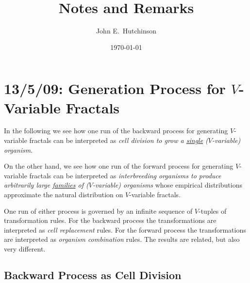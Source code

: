 \documentclass[a4paper]{amsart}
\theoremstyle{plain}
\theoremstyle{definition}
\theoremstyle{remark}
\begin{document}
\title{Notes and Remarks}  
\author{John E.\ Hutchinson}
\date{\today}


\maketitle

\tableofcontents


\section{\textbf{13/5/09: Generation Process for $ V $-Variable Fractals}} 

In the following we see how one run of the backward process for generating $ V $-variable fractals can be interpreted as \emph{cell division to grow a  \underline{single}  \emph{($ V $-variable)} organism}.

On the other hand, we see how one run of the forward process for generating $ V $-variable fractals can be interpreted as  \emph{interbreeding organisms to produce  arbitrarily large  \underline{families}
of  \emph{($ V $-variable)} organisms} whose empirical distributions approximate  the natural distribution on $ V $-variable fractals.

One run of either  process  is governed by an infinite sequence of $ V $-tuples of transformation rules.  For the backward process the transformations are interpreted as \emph{cell replacement} rules.   For the forward process  the transformations are interpreted  as \emph{organism combination} rules.  The results are related, but also very different.


\subsection{Backward Process as   Cell Division}  
\end{document}
